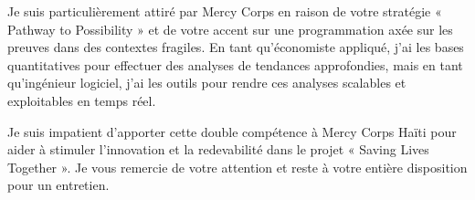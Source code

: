 \documentclass[11pt,a4paper,sans]{moderncv}
\begin{document}
Je suis particulièrement attiré par Mercy Corps en raison de votre stratégie « Pathway to Possibility » et de votre accent sur une programmation axée sur les preuves dans des contextes fragiles. En tant qu'économiste appliqué, j'ai les bases quantitatives pour effectuer des analyses de tendances approfondies, mais en tant qu'ingénieur logiciel, j'ai les outils pour rendre ces analyses scalables et exploitables en temps réel.

Je suis impatient d'apporter cette double compétence à Mercy Corps Haïti pour aider à stimuler l'innovation et la redevabilité dans le projet « Saving Lives Together ». Je vous remercie de votre attention et reste à votre entière disposition pour un entretien.

\makeletterclosing
\end{document}
